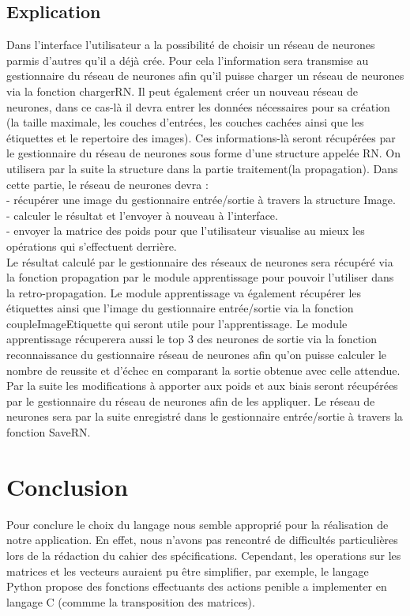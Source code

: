 \documentclass{article}
\begin{document}
	\subsection{Explication}	
	Dans l'interface l'utilisateur a la possibilité de choisir un réseau de neurones parmis d'autres qu'il a déjà crée.
Pour cela l'information sera transmise au gestionnaire du réseau de neurones afin qu'il puisse charger un réseau de neurones via la fonction chargerRN.
Il peut également créer un nouveau réseau de neurones, dans ce cas-là il devra entrer les données nécessaires pour sa création (la taille maximale, les couches d'entrées, les couches cachées ainsi que les étiquettes et le repertoire des images). 
Ces informations-là seront récupérées par le gestionnaire du réseau de neurones sous forme d'une structure appelée RN. 
On utilisera par la suite la structure dans la partie traitement(la propagation).
Dans cette partie, le réseau de neurones devra : \\
- récupérer une image du gestionnaire entrée/sortie à travers la structure Image.\\
- calculer le résultat et l'envoyer à nouveau à l'interface.\\
- envoyer la matrice des poids pour que l'utilisateur visualise au mieux les opérations qui s'effectuent derrière.\\
Le résultat calculé par le gestionnaire des réseaux de neurones sera récupéré via la fonction propagation par le module apprentissage pour pouvoir l'utiliser dans la retro-propagation.
Le module apprentissage va également récupérer les étiquettes ainsi que l'image du gestionnaire entrée/sortie via la fonction coupleImageEtiquette qui seront utile pour l'apprentissage.
Le module apprentissage récuperera aussi le top 3 des neurones de sortie via la fonction reconnaissance du gestionnaire réseau de neurones afin qu'on puisse calculer le nombre de reussite et d'échec en comparant la sortie obtenue avec celle attendue.
Par la suite les modifications à apporter aux poids et aux biais seront récupérées par le gestionnaire du réseau de neurones afin de les appliquer.
Le réseau de neurones sera par la suite enregistré dans le gestionnaire entrée/sortie à travers la fonction SaveRN.	

\section{Conclusion}
Pour conclure le choix du langage nous semble approprié pour la réalisation de notre application. En effet, nous n'avons pas rencontré de difficultés particulières lors de la rédaction du cahier des spécifications. Cependant, les operations sur les matrices et les vecteurs auraient pu être simplifier, par exemple, le langage Python propose des fonctions effectuants des actions penible a implementer en langage C (commme la transposition des matrices).
\end{document}
